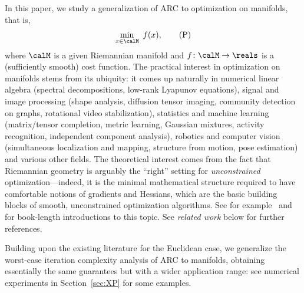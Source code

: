 In this paper, we study a generalization of ARC to optimization on manifolds, that is, %
\begin{align}
	\min_{x \in \calM} \ f(x),
	\label{eq:P}
	\tag{P}
\end{align}
where $\calM$ is a given Riemannian manifold
and $f \colon \calM \to \reals$ is a (sufficiently smooth) cost function.
The practical interest in optimization on manifolds stems from its ubiquity: it comes up naturally in numerical linear algebra (spectral decompositions, low-rank Lyapunov equations), signal and image processing (shape analysis, diffusion tensor imaging, community detection on graphs, rotational video stabilization), statistics and machine learning (matrix/tensor completion, metric learning, Gaussian mixtures, activity recognition, independent component analysis), robotics and computer vision (simultaneous localization and mapping, structure from motion, pose estimation) and various other fields.
The theoretical interest comes from the fact that Riemannian geometry is arguably the ``right'' setting for \emph{unconstrained} optimization---indeed, it is the minimal mathematical structure required to have comfortable notions of gradients and Hessians, which are the basic building blocks of smooth, unconstrained optimization algorithms.
See for example~\citep{AMS08} and~\citep{boumal2020intromanifolds} for book-length introductions to this topic.
See \emph{related work} below for further references.


Building upon the existing literature for the Euclidean case, we generalize the worst-case iteration complexity analysis of ARC to manifolds, obtaining essentially the same guarantees but with a wider application range: see numerical experiments in Section~\ref{sec:XP} for some examples.

